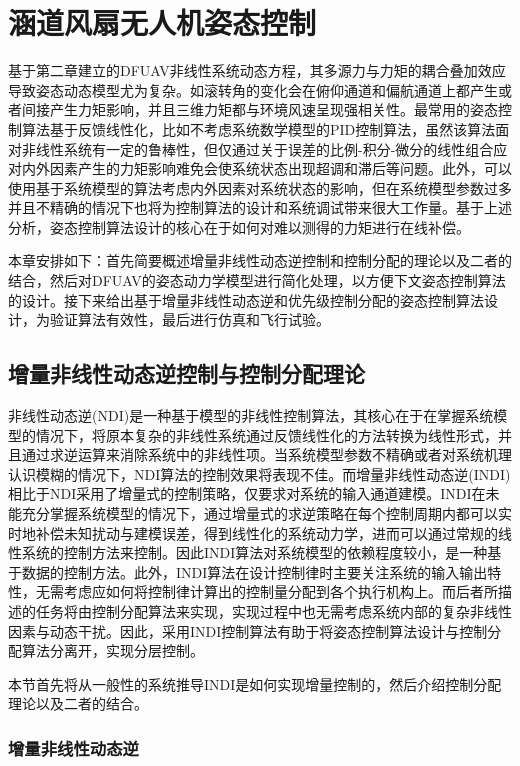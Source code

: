 \chapter{涵道风扇无人机姿态控制}

基于第二章建立的DFUAV非线性系统动态方程，其多源力与力矩的耦合叠加效应导致姿态动态模型尤为复杂。如滚转角的变化会在俯仰通道和偏航通道上都产生或者间接产生力矩影响，并且三维力矩都与环境风速呈现强相关性。最常用的姿态控制算法基于反馈线性化，比如不考虑系统数学模型的PID控制算法，虽然该算法面对非线性系统有一定的鲁棒性，但仅通过关于误差的比例-积分-微分的线性组合应对内外因素产生的力矩影响难免会使系统状态出现超调和滞后等问题。此外，可以使用基于系统模型的算法考虑内外因素对系统状态的影响，但在系统模型参数过多并且不精确的情况下也将为控制算法的设计和系统调试带来很大工作量。基于上述分析，姿态控制算法设计的核心在于如何对难以测得的力矩进行在线补偿。

本章安排如下：首先简要概述增量非线性动态逆控制和控制分配的理论以及二者的结合，然后对DFUAV的姿态动力学模型进行简化处理，以方便下文姿态控制算法的设计。接下来给出基于增量非线性动态逆和优先级控制分配的姿态控制算法设计，为验证算法有效性，最后进行仿真和飞行试验。

\section{增量非线性动态逆控制与控制分配理论}

非线性动态逆(NDI)是一种基于模型的非线性控制算法，其核心在于在掌握系统模型的情况下，将原本复杂的非线性系统通过反馈线性化的方法转换为线性形式，并且通过求逆运算来消除系统中的非线性项。当系统模型参数不精确或者对系统机理认识模糊的情况下，NDI算法的控制效果将表现不佳。而增量非线性动态逆(INDI)相比于NDI采用了增量式的控制策略，仅要求对系统的输入通道建模。INDI在未能充分掌握系统模型的情况下，通过增量式的求逆策略在每个控制周期内都可以实时地补偿未知扰动与建模误差，得到线性化的系统动力学，进而可以通过常规的线性系统的控制方法来控制\cite{wangStabilityAnalysisIncremental2019b}。因此INDI算法对系统模型的依赖程度较小，是一种基于数据的控制方法。此外，INDI算法在设计控制律时主要关注系统的输入输出特性，无需考虑应如何将控制律计算出的控制量分配到各个执行机构上。而后者所描述的任务将由控制分配算法来实现，实现过程中也无需考虑系统内部的复杂非线性因素与动态干扰。因此，采用INDI控制算法有助于将姿态控制算法设计与控制分配算法分离开，实现分层控制。

本节首先将从一般性的系统推导INDI是如何实现增量控制的，然后介绍控制分配理论以及二者的结合。

\subsection{增量非线性动态逆}\label{增量非线性动态逆}

